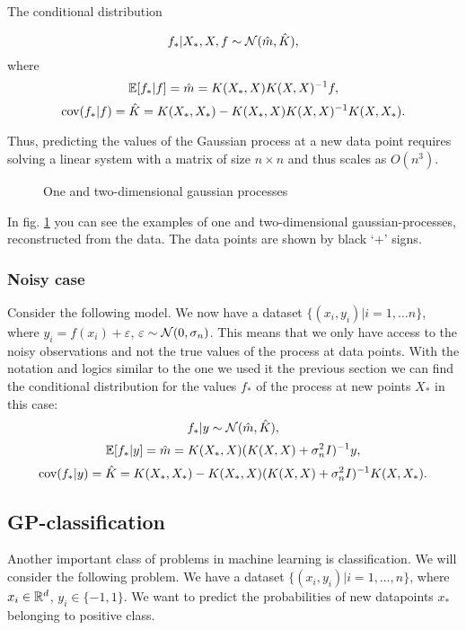 \documentclass[12pt]{article}
\begin{document}
	The conditional distribution
	
	$$f_* | X_*, X, f \sim \mathcal{N}( \hat m, \hat K ),$$
	where 
	$$\mathbb{E} [f_* | f ] = \hat m = K(X_*, X) K(X, X)^{-1} f,$$
	$$\mbox{cov}(f_* | f ) = \hat K = K(X_*, X_*) - K(X_*, X)K(X, X)^{-1}K(X, X_*).$$
		
	Thus, predicting the values of the Gaussian process at a new data point requires solving a linear system with a matrix of size $n \times n$ and thus scales as $O(n^3)$.

	\begin{figure}[!h]
		\centering
		\subfloat{
			\scalebox{0.7}{
				
			}
		}
		\subfloat{
			\scalebox{0.7}{
	    		
			}
		}
		\caption{One and two-dimensional gaussian processes}
		\label{brute_reg_example}
	\end{figure}


	In fig. \ref{brute_reg_example} you can see the examples of one and two-dimensional gaussian-processes, reconstructed from the data. The data points are shown by black `$+$' signs.
	
	\subsubsection{Noisy case}
		Consider the following model. We now have a dataset $\{(x_i, y_i)| i = 1, \ldots n\}$, where $y_i = f(x_i) + \varepsilon$, $\varepsilon \sim \mathcal{N}(0, \sigma_n)$. This means that we only have access to the noisy observations and not the true values of the process at data points. With the notation and logics similar to the one we used it the previous section we can find the conditional distribution for the values $f_*$ of the process at new points $X_*$ in this case:
		$$f_* | y \sim \mathcal{N}( \hat m, \hat K ),$$
		$$\mathbb{E}[f_* | y] = \hat m = K(X_*, X) (K(X, X) + \sigma_n^2 I)^{-1} y,$$
		$$\mbox{cov}(f_* | y ) = \hat K = K(X_*, X_*) - K(X_*, X)(K(X, X) + \sigma_n^2 I)^{-1}K(X, X_*).$$
		
\subsection{GP-classification}
	\label{gp-classification}
	Another important class of problems in machine learning is classification. We will consider the following problem. We have a dataset $\{(x_i, y_i) | i = 1, \ldots, n\}$, where $x_i \in \mathbb{R}^d$, $y_i \in \{-1, 1\}$. We want to predict the probabilities of new datapoints $x_*$ belonging to positive class.
\end{document}

